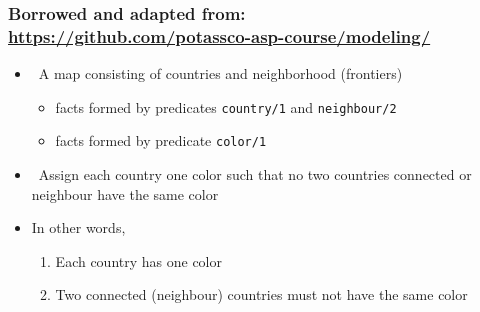 \documentclass{beamer}
\begin{document}
\begin{frame}[fragile] 

	\frametitle{Borrowed and adapted from:\\ {\small \url{https://github.com/potassco-asp-course/modeling/}}} 
 
 \begin{itemize}
  \item {} \ A map consisting of countries and neighborhood  (frontiers)
    \begin{itemize}
    \item facts formed by predicates \texttt{country/1} and \texttt{neighbour/2}
    \item  facts formed by predicate  \texttt{color/1}
    \end{itemize}
    \medskip
  \item {} \ Assign each country one color such that no two countries connected
    or  neighbour  have the same color
    \medskip
  \item In other words,
    \begin{enumerate}
    \item Each country has one color
    \item Two connected (neighbour) countries must not have the same color
    \end{enumerate}
  \end{itemize}
\end{frame}
\end{document}
